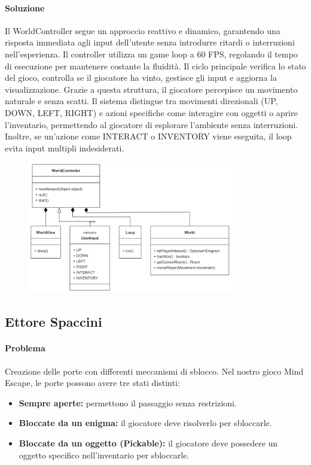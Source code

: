 \documentclass[a4paper,12pt]{report}
\begin{document}
\paragraph{Soluzione} Il WorldController segue un approccio reattivo e dinamico, garantendo una risposta immediata agli input dell’utente senza introdurre ritardi o interruzioni nell’esperienza.
Il controller utilizza un game loop a 60 FPS, regolando il tempo di esecuzione per mantenere costante la fluidità. Il ciclo principale verifica lo stato del gioco, controlla se il giocatore ha vinto, gestisce gli input e aggiorna la visualizzazione. Grazie a questa struttura, il giocatore percepisce un movimento naturale e senza scatti.
Il sistema distingue tra movimenti direzionali (UP, DOWN, LEFT, RIGHT) e azioni specifiche come interagire con oggetti o aprire l’inventario, permettendo al giocatore di esplorare l’ambiente senza interruzioni. Inoltre, se un’azione come INTERACT o INVENTORY viene eseguita, il loop evita input multipli indesiderati.
\begin{figure}   %
    \centering
    \includegraphics[width=0.8\textwidth]{img/worldController.png}  %
    \label{img:worldController}
\end{figure}
%
\subsection{Ettore Spaccini}
%
\paragraph{Problema} %
Creazione delle porte con differenti meccanismi di sblocco.
Nel nostro gioco Mind Escape, le porte possono avere tre stati distinti:
\begin{itemize}
	\item \textbf{Sempre aperte:} permettono il passaggio senza restrizioni.
	\item \textbf{Bloccate da un enigma:} il giocatore deve risolverlo per sbloccarle.
	\item \textbf{Bloccate da un oggetto (Pickable):} il giocatore deve possedere un oggetto specifico nell’inventario per sbloccarle.
\end{itemize}
\end{document}
